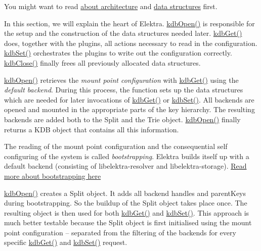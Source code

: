 You might want to read \hyperlink{doc_dev_architecture_md}{about architecture} and \hyperlink{doc_dev_data-structures_md}{data structures} first.

In this section, we will explain the heart of Elektra. {\ttfamily \hyperlink{group__kdb_ga6808defe5870f328dd17910aacbdc6ca}{kdb\+Open()}} is responsible for the setup and the construction of the data structures needed later. {\ttfamily \hyperlink{group__kdb_ga28e385fd9cb7ccfe0b2f1ed2f62453a1}{kdb\+Get()}} does, together with the plugins, all actions necessary to read in the configuration. {\ttfamily \hyperlink{group__kdb_ga11436b058408f83d303ca5e996832bcf}{kdb\+Set()}} orchestrates the plugins to write out the configuration correctly. {\ttfamily \hyperlink{group__kdb_gadb54dc9fda17ee07deb9444df745c96f}{kdb\+Close()}} finally frees all previously allocated data structures.

{\ttfamily \hyperlink{group__kdb_ga6808defe5870f328dd17910aacbdc6ca}{kdb\+Open()}} retrieves the {\itshape mount point configuration} with {\ttfamily \hyperlink{group__kdb_ga28e385fd9cb7ccfe0b2f1ed2f62453a1}{kdb\+Get()}} using the {\itshape default backend}. During this process, the function sets up the data structures which are needed for later invocations of {\ttfamily \hyperlink{group__kdb_ga28e385fd9cb7ccfe0b2f1ed2f62453a1}{kdb\+Get()}} or {\ttfamily \hyperlink{group__kdb_ga11436b058408f83d303ca5e996832bcf}{kdb\+Set()}}. All backends are opened and mounted in the appropriate parts of the key hierarchy. The resulting backends are added both to the {\ttfamily Split} and the {\ttfamily Trie} object. {\ttfamily \hyperlink{group__kdb_ga6808defe5870f328dd17910aacbdc6ca}{kdb\+Open()}} finally returns a {\ttfamily K\+DB} object that contains all this information.

The reading of the mount point configuration and the consequential self configuring of the system is called {\itshape bootstrapping}. Elektra builds itself up with a default backend (consisting of {\ttfamily libelektra-\/resolver} and {\ttfamily libelektra-\/storage}). \hyperlink{doc_help_elektra-bootstrapping_md}{Read more about bootstrapping here}

{\ttfamily \hyperlink{group__kdb_ga6808defe5870f328dd17910aacbdc6ca}{kdb\+Open()}} creates a {\ttfamily Split} object. It adds all backend handles and {\ttfamily parent\+Keys} during bootstrapping. So the buildup of the {\ttfamily Split} object takes place once. The resulting object is then used for both {\ttfamily \hyperlink{group__kdb_ga28e385fd9cb7ccfe0b2f1ed2f62453a1}{kdb\+Get()}} and {\ttfamily \hyperlink{group__kdb_ga11436b058408f83d303ca5e996832bcf}{kdb\+Set()}}. This approach is much better testable because the {\ttfamily Split} object is first initialised using the mount point configuration -- separated from the filtering of the backends for every specific {\ttfamily \hyperlink{group__kdb_ga28e385fd9cb7ccfe0b2f1ed2f62453a1}{kdb\+Get()}} and {\ttfamily \hyperlink{group__kdb_ga11436b058408f83d303ca5e996832bcf}{kdb\+Set()}} request.

